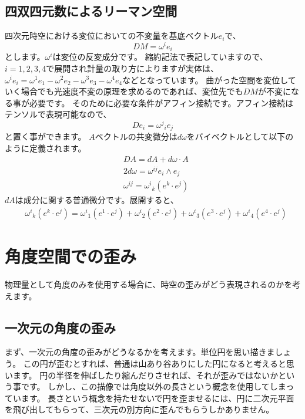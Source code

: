 \documentclass[a4paper,12pt,notitlepage]{jsreport}
\begin{document}
\section{四双四元数によるリーマン空間}

四次元時空における変位においての不変量を基底ベクトル$e_i$で、
\begin{equation}
  DM=\omega^ie_i
\end{equation}
とします。$\omega^i$は変位の反変成分です。
縮約記法で表記していますので、$i=1,2,3,4$で展開され計量の取り方によりますが実体は、
$\omega^ie_i=\omega^1e_1-\omega^2e_2-\omega^3e_3-\omega^4e_4$などとなっています。
曲がった空間を変位していく場合でも光速度不変の原理を求めるのであれば、変位先でも$DM$が不変になる事が必要です。
そのために必要な条件がアフィン接続です。アフィン接続はテンソルで表現可能なので、
\begin{equation}
  De_i={\omega^j}_ie_j
\end{equation}
と置く事ができます。
$A$ベクトルの共変微分は$d\omega$をバイベクトルとして以下のように定義されます。
\begin{equation}
  \begin{split}
    &DA=dA+d\omega\cdot A\\
    &2d\omega=\omega^{ij}e_i\wedge e_j\\
    &\omega^{ij}={\omega^i}_k(e^k\cdot e^j)
  \end{split}
\end{equation}
$dA$は成分に関する普通微分です。展開すると、
\begin{equation}
  \begin{split}
    &{\omega^i}_k(e^k\cdot e^j)={\omega^i}_1(e^1\cdot e^j)+{\omega^i}_2(e^2\cdot e^j)+{\omega^i}_3(e^3\cdot e^j)+{\omega^i}_4(e^4\cdot e^j)
  \end{split}
\end{equation}



\chapter{角度空間での歪み}

物理量として角度のみを使用する場合に、時空の歪みがどう表現されるのかを考えます。

\section{一次元の角度の歪み}

まず、一次元の角度の歪みがどうなるかを考えます。単位円を思い描きましょう。
この円が歪むとすれば、普通は山あり谷ありにした円になると考えると思います。
円の半径を伸ばしたり縮んだりさせれば、それが歪みではないかという事です。
しかし、この描像では角度以外の長さという概念を使用してしまっています。
長さという概念を持たせないで円を歪ませるには、円に二次元平面を飛び出してもらって、三次元の別方向に歪んでもらうしかありません。
\end{document}
